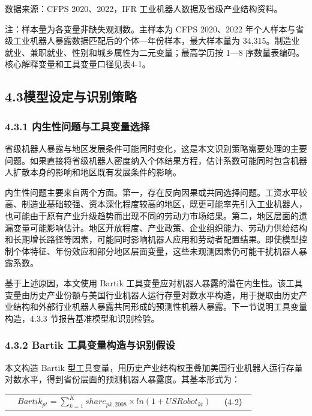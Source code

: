 数据来源：CFPS 2020、2022，IFR 工业机器人数据及省级产业结构资料。

注：样本量为各变量非缺失观测数。主样本为 CFPS 2020、2022 年个人样本与省级工业机器人暴露数据匹配后的个体---年份样本，最大样本量为 34,315。制造业就业、兼职就业、性别和城乡属性为二元变量；最高学历按 1---8 序数量表编码。核心解释变量和工具变量口径见表4-1。

\subsection{4.3模型设定与识别策略}\label{ux6a21ux578bux8bbeux5b9aux4e0eux8bc6ux522bux7b56ux7565}

\subsubsection{4.3.1 内生性问题与工具变量选择}\label{ux5185ux751fux6027ux95eeux9898ux4e0eux5de5ux5177ux53d8ux91cfux9009ux62e9}

省级机器人暴露与地区发展条件可能同时变化，这是本文识别策略需要处理的主要问题。如果直接将省级机器人密度纳入个体结果方程，估计系数可能同时包含机器人扩散本身的影响和地区既有发展条件的影响。

内生性问题主要来自两个方面。第一，存在反向因果或共同选择问题。工资水平较高、制造业基础较强、资本深化程度较高的地区，既更可能率先引入工业机器人，也可能由于原有产业升级趋势而出现不同的劳动力市场结果。第二，地区层面的遗漏变量可能影响估计。地区开放程度、产业政策、企业组织能力、劳动力供给结构和长期增长路径等因素，可能同时影响机器人应用和劳动者配置结果。即使模型控制个体特征、年份效应和部分地区层面变量，这些未观测因素仍可能干扰机器人暴露系数。

基于上述原因，本文使用 Bartik 工具变量应对机器人暴露的潜在内生性。该工具变量由历史产业份额与美国行业机器人运行存量对数水平构造，用于提取由历史产业结构和外部行业机器人暴露共同形成的预测性机器人暴露。下一节说明工具变量构造，4.3.3 节报告基准模型和识别检验。

\subsubsection{4.3.2 Bartik 工具变量构造与识别假设}\label{bartik-ux5de5ux5177ux53d8ux91cfux6784ux9020ux4e0eux8bc6ux522bux5047ux8bbe}

本文构造 Bartik 型工具变量，用历史产业结构权重叠加美国行业机器人运行存量对数水平，得到省份层面的预测机器人暴露度。其基本形式为：

{\def\LTcaptype{none} %
\begin{longtable}[]{@{}
  >{\centering\arraybackslash}p{}
  >{\centering\arraybackslash}p{}
  >{\raggedright\arraybackslash}p{}@{}}
\toprule\noalign{}
\endhead
\bottomrule\noalign{}
\endlastfoot
& \(Bartik_{pt} = \sum_{k = 1}^{K}share_{pk,2008} \times ln(1 + USRobot_{kt})\) & （4-2） \\
\end{longtable}
}

